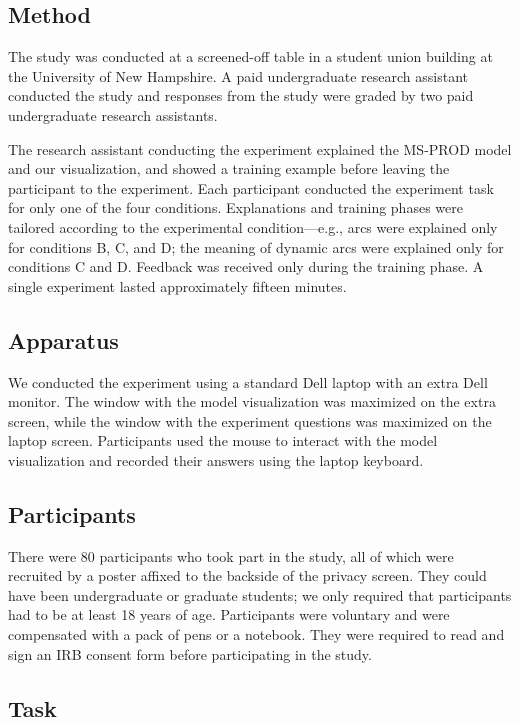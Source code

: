 \subsection{Method}

The study was conducted at a screened-off table in a student union building at the University of New Hampshire.  A paid undergraduate research assistant conducted the study and responses from the study were graded by two paid undergraduate research assistants.

The research assistant conducting the experiment explained the MS-PROD model and our visualization, and showed a training example before leaving the participant to the experiment.  Each participant conducted the experiment task for only one of the four conditions.  Explanations and training phases were tailored according to the experimental condition---e.g., arcs were explained only for conditions B, C, and D; the meaning of dynamic arcs were explained only for conditions C and D.  Feedback was received only during the training phase.  A single experiment lasted approximately fifteen minutes.

\subsection{Apparatus}

We conducted the experiment using a standard Dell laptop with an extra Dell monitor.  The window with the model visualization was maximized on the extra screen, while the window with the experiment questions was maximized on the laptop screen.  Participants used the mouse to interact with the model visualization and recorded their answers using the laptop keyboard.

\subsection{Participants}

There were 80 participants who took part in the study, all of which were recruited by a poster affixed to the backside of the privacy screen.  They could have been undergraduate or graduate students; we only required that participants had to be at least 18 years of age.  Participants were voluntary and were compensated with a pack of pens or a notebook.  They were required to read and sign an IRB consent form before participating in the study.

\subsection{Task}

